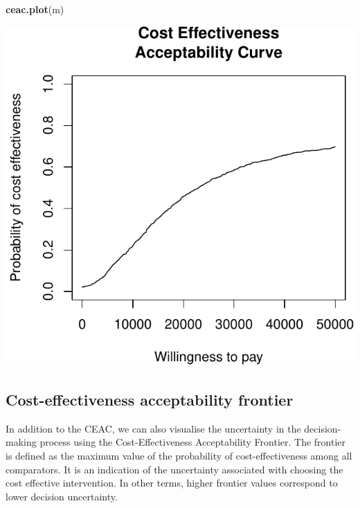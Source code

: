 \documentclass[]{article}
\newenvironment{Shaded}{\begin{snugshade}}{\end{snugshade}}
\newcommand{\ControlFlowTok}[1]{\textcolor[rgb]{0.13,0.29,0.53}{\textbf{#1}}}
\newcommand{\DataTypeTok}[1]{\textcolor[rgb]{0.13,0.29,0.53}{#1}}
\newcommand{\DecValTok}[1]{\textcolor[rgb]{0.00,0.00,0.81}{#1}}
\newcommand{\KeywordTok}[1]{\textcolor[rgb]{0.13,0.29,0.53}{\textbf{#1}}}
\newcommand{\NormalTok}[1]{#1}
\newcommand{\OperatorTok}[1]{\textcolor[rgb]{0.81,0.36,0.00}{\textbf{#1}}}
\newcommand{\OtherTok}[1]{\textcolor[rgb]{0.56,0.35,0.01}{#1}}
\newcommand{\StringTok}[1]{\textcolor[rgb]{0.31,0.60,0.02}{#1}}
\begin{document}
\begin{Shaded}
\begin{Highlighting}[]
\KeywordTok{ceac.plot}\NormalTok{(m)}
\end{Highlighting}
\end{Shaded}

\begin{center}\includegraphics{report_files/figure-latex/unnamed-chunk-5-1} \end{center}

\hypertarget{cost-effectiveness-acceptability-frontier}{%
\subsection{Cost-effectiveness acceptability
frontier}\label{cost-effectiveness-acceptability-frontier}}

In addition to the CEAC, we can also visualise the uncertainty in the
decision-making process using the Cost-Effectiveness Acceptability
Frontier. The frontier is defined as the maximum value of the
probability of cost-effectiveness among all comparators. It is an
indication of the uncertainty associated with choosing the cost
effective intervention. In other terms, higher frontier values
correspond to lower decision uncertainty.

\begin{Shaded}
\end{Shaded}
\end{document}
